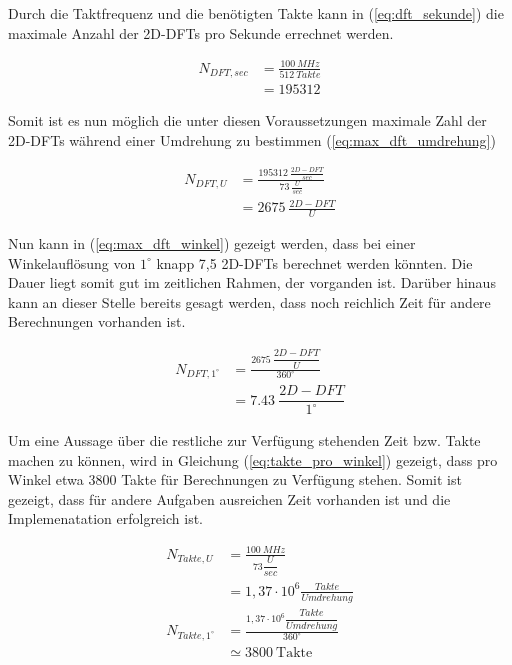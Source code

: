  Durch die Taktfrequenz und die benötigten Takte kann in (\ref{eq:dft_sekunde}) die maximale Anzahl der 2D-DFTs pro Sekunde errechnet werden.
 
 \begin{equation}\label{eq:dft_sekunde}
  \begin{split}
   N_{DFT, sec} &= \frac{\SI{100}{MHz}}{\SI{512}{Takte}}\\
                &= 195312
  \end{split}
 \end{equation}

 Somit ist es nun möglich die unter diesen Voraussetzungen maximale Zahl der 2D-DFTs während einer Umdrehung zu bestimmen (\ref{eq:max_dft_umdrehung})
 
 \begin{equation}\label{eq:max_dft_umdrehung}
  \begin{split}
   N_{DFT,U}  &= \frac{\SI{195312}{\frac{2D-DFT}{sec}}}{\SI{73}{\frac{U}{sec}}}\\
              &= \SI{2675}{\frac{2D-DFT}{U}}
  \end{split} 
 \end{equation}

 Nun kann in (\ref{eq:max_dft_winkel}) gezeigt werden, dass bei einer Winkelauflösung von $1^\circ$ knapp 7,5 2D-DFTs berechnet werden könnten. Die Dauer liegt somit 
 gut im zeitlichen Rahmen, der vorganden ist. Darüber hinaus kann an dieser Stelle bereits gesagt werden, dass noch reichlich Zeit für andere Berechnungen vorhanden ist.
 
 \begin{equation}\label{eq:max_dft_winkel}
  \begin{split}
   N_{DFT,1^\circ} &= \frac{\SI{2675}{\dfrac{2D-DFT}{U}}}{360^\circ}\\
                   &= \SI{7,43}{\dfrac{2D-DFT}{1^\circ}}
  \end{split}
 \end{equation}

 
 Um eine Aussage über die restliche zur Verfügung stehenden Zeit bzw. Takte machen zu können, wird in Gleichung (\ref{eq:takte_pro_winkel}) gezeigt, dass pro Winkel 
 etwa 3800 Takte für Berechnungen zu Verfügung stehen. Somit ist gezeigt, dass für andere Aufgaben ausreichen Zeit vorhanden ist und die Implemenatation 
 erfolgreich ist.
 
 \begin{equation}\label{eq:takte_pro_winkel}
  \begin{split}
   N_{Takte, U} &= \frac{\SI{100}{MHz}}{73\dfrac{U}{sec}}\\
                &= 1,37\cdot 10^6 \frac{Takte}{Umdrehung}\\
   N_{Takte, 1^\circ} &= \frac{1,37\cdot 10^6 \dfrac{Takte}{Umdrehung}}{360^\circ}\\
                      &\simeq 3800 \ \textrm{Takte}
  \end{split}
 \end{equation}

